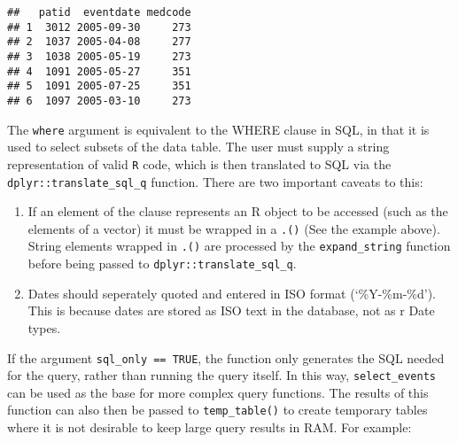 \documentclass[]{article}
\newenvironment{Shaded}{\begin{snugshade}}{\end{snugshade}}
\newcommand{\KeywordTok}[1]{\textcolor[rgb]{0.13,0.29,0.53}{\textbf{{#1}}}}
\newcommand{\DataTypeTok}[1]{\textcolor[rgb]{0.13,0.29,0.53}{{#1}}}
\newcommand{\StringTok}[1]{\textcolor[rgb]{0.31,0.60,0.02}{{#1}}}
\newcommand{\NormalTok}[1]{{#1}}
\begin{document}
\begin{Shaded}
\end{Shaded}

\begin{verbatim}
##   patid  eventdate medcode
## 1  3012 2005-09-30     273
## 2  1037 2005-04-08     277
## 3  1038 2005-05-19     273
## 4  1091 2005-05-27     351
## 5  1091 2005-07-25     351
## 6  1097 2005-03-10     273
\end{verbatim}

The \texttt{where} argument is equivalent to the WHERE clause in SQL, in
that it is used to select subsets of the data table. The user must
supply a string representation of valid \texttt{R} code, which is then
translated to SQL via the \texttt{dplyr::translate\_sql\_q} function.
There are two important caveats to this:

\begin{enumerate}
\def\labelenumi{\arabic{enumi}.}
\itemsep1pt\parskip0pt
\item
  If an element of the clause represents an R object to be accessed
  (such as the elements of a vector) it must be wrapped in a
  \texttt{.()} (See the example above). String elements wrapped in
  \texttt{.()} are processed by the \texttt{expand\_string} function
  before being passed to \texttt{dplyr::translate\_sql\_q}.
\item
  Dates should seperately quoted and entered in ISO format
  (`\%Y-\%m-\%d'). This is because dates are stored as ISO text in the
  database, not as r Date types.
\end{enumerate}

If the argument \texttt{sql\_only == TRUE}, the function only generates
the SQL needed for the query, rather than running the query itself. In
this way, \texttt{select\_events} can be used as the base for more
complex query functions. The results of this function can also then be
passed to \texttt{temp\_table()} to create temporary tables where it is
not desirable to keep large query results in RAM. For example:
\end{document}
